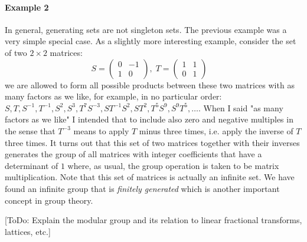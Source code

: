 \paragraph{Example 2} In general, generating sets are not singleton sets. The previous example was a very simple special case. As a slightly more interesting example, consider the set of two $2 \times 2$ matrices:
\begin{equation}
S = \begin{pmatrix}  0 & -1 \\  1  &  0  \end{pmatrix}, \;
T = \begin{pmatrix}  1 &  1 \\  0  &  1  \end{pmatrix} \quad
\end{equation}
we are allowed to form all possible products between these two matrices with as many factors as we like, for example, in no particular order: $S, T, S^{-1}, T^{-1}, S^2, S^3, T^7 S^{-3}, S T^{-1} S^2, S T^2, T^5 S^9, S^9 T^5, \ldots$. When I said "as many factors as we like" I intended that to include also zero and negative multiples in the sense that $T^{-3}$ means to apply $T$ minus three times, i.e. apply the inverse of $T$ three times. It turns out that this set of two matrices together with their inverses generates the group of all matrices with integer coefficients that have a determinant of $1$ where, as usual, the group operation is taken to be matrix multiplication. Note that this set of matrices is actually an infinite set. We have found an infinite group that is \emph{finitely generated} which is another important concept in group theory.

[ToDo: Explain the modular group and its relation to linear fractional transforms, lattices, etc.]


